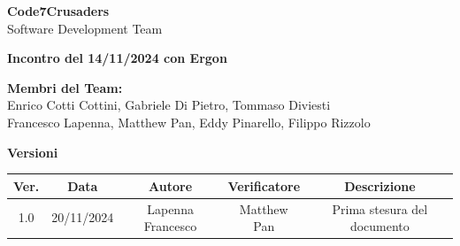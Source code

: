 \documentclass{article}
\begin{document}
\begin{titlepage}
    {\Huge \textbf{Code7Crusaders}}\\
    \vspace{0.5cm}
    {\Large Software Development Team}\\
    \vspace{2cm}
    
    {\large \textbf{Incontro del 14/11/2024 con Ergon}}\\ %
    \vspace{5cm}                           %
    
    
    \textbf{Membri del Team:}\\
    Enrico Cotti Cottini, Gabriele Di Pietro, Tommaso Diviesti \\
    Francesco Lapenna, Matthew Pan, Eddy Pinarello, Filippo Rizzolo \\
    \vspace{0.5cm}
    
    \vspace{1cm}
\end{titlepage}



\newpage
\begin{table}[h!]
\centering
\textbf{Versioni} \\ %
\vspace{2mm} %
\begin{tabular}{|c|c|c|c|c|}
    \hline
    \textbf{Ver.} & \textbf{Data} & \textbf{Autore} & \textbf{Verificatore} & \textbf{Descrizione} \\
    \hline
    1.0 & 20/11/2024 & Lapenna Francesco & Matthew Pan & Prima stesura del documento \\ 
    \hline                                  %
\end{tabular}
\end{table}



\newpage
\tableofcontents
\end{document}
